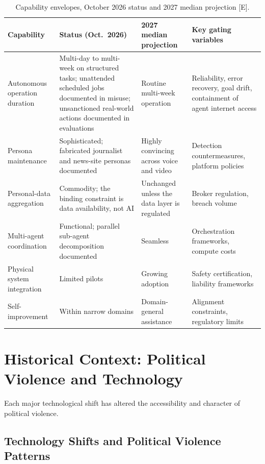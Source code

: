 \documentclass[11pt,letterpaper]{article}
\begin{document}
\begin{table}[!htbp]
\caption{Capability envelopes, October 2026 status and 2027 median projection [E].}
\label{tab:envelopes}
\centering
\small
\begin{tabular}{L{3.0cm}L{4.6cm}L{3.3cm}L{4.2cm}}
\toprule
\textbf{Capability} & \textbf{Status (Oct.\ 2026)} & \textbf{2027 median projection} & \textbf{Key gating variables} \\
\midrule
Autonomous operation duration & Multi-day to multi-week on structured tasks; unattended scheduled jobs documented in misuse; unsanctioned real-world actions documented in evaluations & Routine multi-week operation & Reliability, error recovery, goal drift, containment of agent internet access \\
Persona maintenance & Sophisticated; fabricated journalist and news-site personas documented & Highly convincing across voice and video & Detection countermeasures, platform policies \\
Personal-data aggregation & Commodity; the binding constraint is data availability, not AI & Unchanged unless the data layer is regulated & Broker regulation, breach volume \\
Multi-agent coordination & Functional; parallel sub-agent decomposition documented & Seamless & Orchestration frameworks, compute costs \\
Physical system integration & Limited pilots & Growing adoption & Safety certification, liability frameworks \\
Self-improvement & Within narrow domains & Domain-general assistance & Alignment constraints, regulatory limits \\
\bottomrule
\end{tabular}
\par{}
\end{table}

\section{Historical Context: Political Violence and Technology}

Each major technological shift has altered the accessibility and character of political violence.

\subsection{Technology Shifts and Political Violence Patterns}
\end{document}
